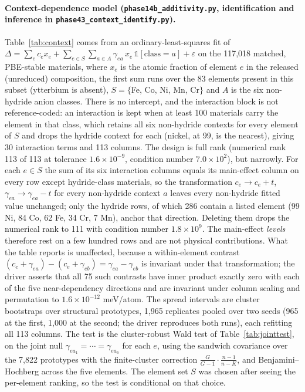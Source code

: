 \documentclass[11pt]{article}
\begin{document}
\paragraph{Context-dependence model (\texttt{phase14b\_additivity.py}, identification
and inference in \texttt{phase43\_context\_identify.py}).} Table~\ref{tab:context} comes
from an ordinary-least-squares fit of $\Delta = \sum_e c_e x_e + \sum_{e \in S}\sum_{a
\in A} \gamma_{ea}\, x_e\, \mathbb{1}[\text{class}=a] + \varepsilon$ on the 117{,}018
matched, PBE-stable materials, where $x_e$ is the atomic fraction of element $e$ in the released
(unreduced) composition, the first sum runs over the 83 elements present in this subset (ytterbium is absent), $S = \{$Fe, Co, Ni, Mn,
Cr$\}$ and $A$ is the six non-hydride anion classes. There is no intercept, and the
interaction block is not reference-coded: an interaction is kept when at least 100
materials carry the element in that class, which retains all six non-hydride contexts for
every element of $S$ and drops the hydride context for each (nickel, at 99, is the
nearest), giving 30 interaction terms and 113 columns. The design is full rank (numerical rank 113 of 113 at tolerance $1.6\times10^{-9}$,
condition number $7.0\times10^{2}$), but narrowly. For each $e \in S$ the sum of its six
interaction columns equals its main-effect column on every row except hydride-class
materials, so the transformation $c_e \to c_e + t$, $\gamma_{ea} \to \gamma_{ea} - t$
for every non-hydride context $a$ leaves every non-hydride fitted value unchanged; only
the hydride rows, of which 286 contain a listed element (99 Ni, 84 Co, 62 Fe, 34 Cr,
7 Mn), anchor that direction. Deleting them drops the numerical rank to 111 with condition
number $1.8\times10^{9}$. The main-effect \emph{levels} therefore rest on a few hundred rows
and are not physical contributions. What the table reports is unaffected, because a
within-element contrast $(c_e + \gamma_{ea}) - (c_e + \gamma_{eb}) = \gamma_{ea} -
\gamma_{eb}$ is invariant under that transformation; the driver asserts that all 75 such
contrasts have inner product exactly zero with each of the five near-dependency
directions and are invariant under column scaling and permutation to
$1.6\times10^{-12}$ meV/atom.
The spread intervals are cluster bootstraps over structural prototypes, 1{,}965
replicates pooled over two seeds (965 at the first, 1{,}000 at the second; the driver
reproduces both runs), each refitting all 113 columns. The test is the
cluster-robust Wald test of Table~\ref{tab:jointtest}, on the joint null $\gamma_{ea_1} =
\cdots = \gamma_{ea_6}$ for each $e$, using the sandwich covariance over the 7{,}822
prototypes with the finite-cluster correction $\frac{G}{G-1}\cdot\frac{n-1}{n-K}$, and
Benjamini--Hochberg across the five elements. The element set $S$ was chosen after
seeing the per-element ranking, so the test is conditional on that choice.
\end{document}
